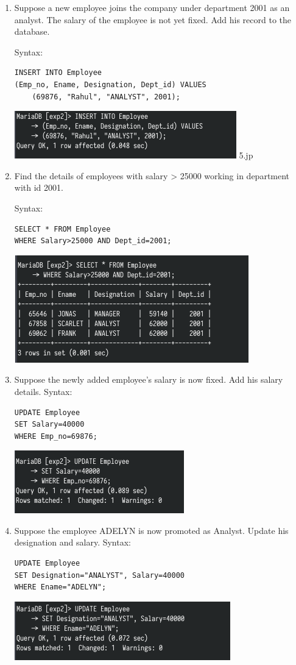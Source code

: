 \documentclass[13pt,oneside]{book}
\begin{document}
\begin{enumerate}
    \item
    Suppose a new employee joins the company under department 2001 as
an analyst. The salary of the employee is not yet fixed. Add his record to
the database.

    Syntax:
    \begin{verbatim}
INSERT INTO Employee
(Emp_no, Ename, Designation, Dept_id) VALUES
	(69876, "Rahul", "ANALYST", 2001);
    \end{verbatim}
    \includegraphics[]{img/p2/ss5.png}
	5.jp
\item
Find the details of employees with salary > 25000 working in department
with id 2001.

Syntax:
\begin{verbatim}
SELECT * FROM Employee
WHERE Salary>25000 AND Dept_id=2001;
\end{verbatim}
\includegraphics[]{img/p2/ss6.png}

\item
		Suppose the newly added employee's salary is now fixed. Add his salary
details.
		Syntax: 
		\begin{verbatim}
UPDATE Employee
SET Salary=40000
WHERE Emp_no=69876;
		\end{verbatim}
		\includegraphics{img/p2/ss7.png}
		
	\item
	Suppose the employee ADELYN is now promoted as Analyst. Update his
designation and salary.
Syntax:
    \begin{verbatim}
UPDATE Employee
SET Designation="ANALYST", Salary=40000
WHERE Ename="ADELYN";
    \end{verbatim}
	\includegraphics[]{img/p2/ss8.png}
	

\end{enumerate}
\end{document}
